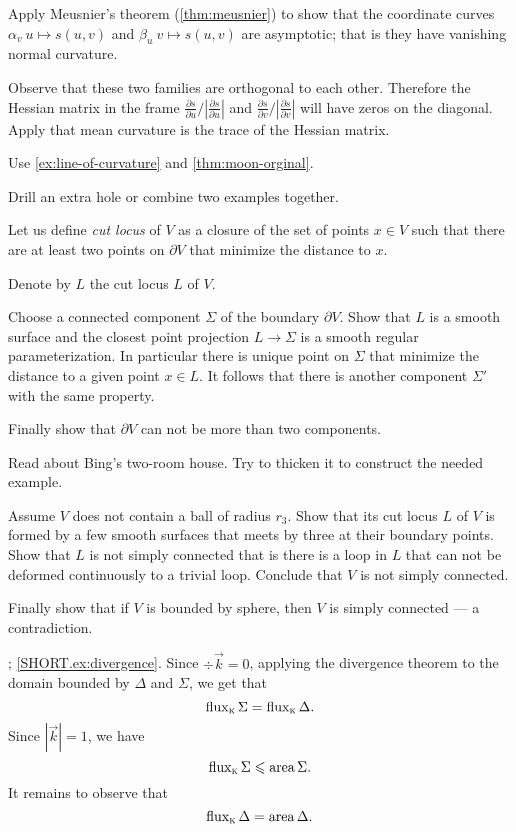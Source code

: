  Apply Meusnier's theorem (\ref{thm:meusnier}) to show that the coordinate curves $\alpha_v\:u\mapsto s(u,v)$ and $\beta_u\:v\mapsto s(u,v)$ are asymptotic; that is they have vanishing normal curvature.

Observe that these two families are orthogonal to each other.
Therefore the Hessian matrix in the frame $\tfrac{\partial s}{\partial u}/|\tfrac{\partial s}{\partial u}|$ and $\tfrac{\partial s}{\partial v}/|\tfrac{\partial s}{\partial v}|$ will have zeros on the diagonal.
Apply that mean curvature is the trace of the Hessian matrix.



 Use \ref{ex:line-of-curvature} and \ref{thm:moon-orginal}.

 Drill an extra hole or combine two examples together.

Let us define \emph{cut locus} of $V$ as a closure of the set of points $x\in V$ such that there are at least two points on $\partial V$ that minimize the distance to $x$.

Denote by $L$ the cut locus $L$ of $V$.

Choose a connected component $\Sigma$ of the boundary $\partial V$.
Show that $L$ is a smooth surface and the closest point projection $L\to \Sigma$ is a smooth regular parameterization.
In particular there is unique point on $\Sigma$ that minimize the distance to a given point $x\in L$.
It follows that there is another component $\Sigma'$ with the same property.

Finally show that $\partial V$ can not be more than two components.

Read about Bing's two-room house.
Try to thicken it to construct the needed example.

Assume $V$ does not contain a ball of radius $r_3$.
Show that its cut locus $L$ of $V$ is formed by a few smooth surfaces that meets by three at their boundary points.
Show that $L$ is not simply connected that is there is a loop in $L$ that can not be deformed continuously to a trivial loop.
Conclude that $V$ is not simply connected.

Finally show that if $V$ is bounded by sphere, then $V$ is simply connected --- a contradiction. 

\parbf{\ref{ex:divergence-1}}; \ref{SHORT.ex:divergence}.
Since $\div\vec k=0$, applying the divergence theorem to the domain bounded by $\Delta$ and $\Sigma$, we get that 
\[\mathop{\rm flux}\nolimits_{\textsc k}\Sigma=\mathop{\rm flux}\nolimits_{\textsc k}\Delta.\]
Since $|\vec k|=1$, we have 
\[\mathop{\rm flux}\nolimits_{\textsc k}\Sigma\leqslant \mathop{\rm area}\nolimits\Sigma.\]
It remains to observe that
\[\mathop{\rm flux}\nolimits_{\textsc k}\Delta=\mathop{\rm area}\nolimits\Delta.\]


